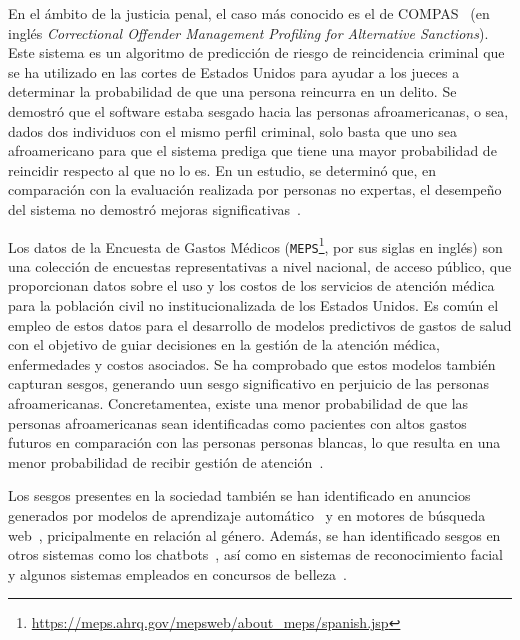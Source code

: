     En el \'ambito de la justicia penal, el caso m\'as conocido es el de COMPAS~\parencite{propublica}
    (en ingl\'es \textit{Correctional Offender Management Profiling for Alternative Sanctions}). Este sistema es un algoritmo de predicci\'on
    de riesgo de reincidencia criminal que se ha utilizado en las cortes de Estados Unidos para ayudar a los jueces a determinar la 
    probabilidad de que una persona reincurra en un delito. Se demostr\'o que el software estaba sesgado hacia las personas 
    afroamericanas, o sea, dados dos individuos con el mismo perfil criminal, solo basta que uno sea afroamericano para que el
    sistema prediga que tiene una mayor probabilidad de reincidir respecto al que no lo es. En un estudio, se determin\'o que, 
    en comparaci\'on con la evaluaci\'on realizada por personas no expertas, el desempe\~no del sistema no demostr\'o mejoras 
    significativas~\parencite{compas2}. 
    
    Los datos de la Encuesta de Gastos M\'edicos (\texttt{MEPS}\footnote{\url{https://meps.ahrq.gov/mepsweb/about_meps/spanish.jsp}}, 
    por sus siglas en ingl\'es) son una colecci\'on de encuestas representativas a nivel nacional, de acceso p\'ublico, que proporcionan 
    datos sobre el uso y los costos de los servicios de atenci\'on m\'edica para la poblaci\'on civil no institucionalizada de los Estados Unidos. 
    Es com\'un el empleo de estos datos para el desarrollo de modelos predictivos de gastos de salud con el objetivo de guiar decisiones 
    en la gesti\'on de la atenci\'on m\'edica, enfermedades y costos asociados. Se ha comprobado que estos modelos tambi\'en capturan sesgos, 
    generando uun sesgo significativo en perjuicio de las personas afroamericanas. Concretamentea, existe una menor probabilidad de que 
    las personas afroamericanas sean identificadas como pacientes con altos gastos futuros en comparaci\'on con las personas personas blancas, 
    lo que resulta en una menor probabilidad de recibir gesti\'on de atenci\'on~\parencite{understanding}.

    Los sesgos presentes en la sociedad tambi\'en se han identificado en anuncios generados por modelos de aprendizaje 
    autom\'atico~\parencite{sweeney2013discrimination,datta2015automated} y en motores de b\'usqueda web~\parencite{unequal_rep}, 
    pricipalmente en relaci\'on al g\'enero. Adem\'as, se han identificado sesgos en otros sistemas como los 
    chatbots~\parencite{chatbot_bias}, as\'i como en sistemas de reconocimiento facial~\parencite{facial_bias} y algunos 
    sistemas empleados en concursos de belleza~\parencite{beauty}.

